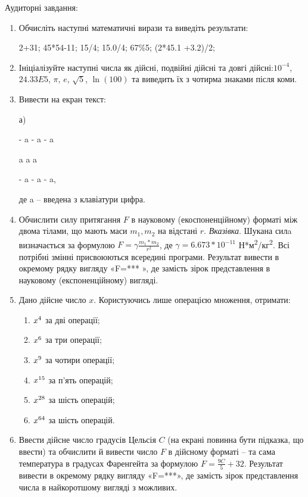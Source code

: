\documentclass[]{article}
\makeatletter
\newcommand{\xslalph}[1]{\expandafter\@xslalph\csname c@#1\endcsname}
\newcommand{\@xslalph}[1]{%
    \ifcase#1\or а\or б\or в\or г\or д\or e\or є\or ж\or з\or i%
    \or й\or к\or л\or м\or н\or о\or п\or р\or с\or т%
    \or у\or ф\or х\or ц\or ч\or ш\or ю\or я\or аа\or бб\or вв%
    \else\@ctrerr\fi%
}
\makeatother
\begin{document}
Аудиторні завдання:

\begin{enumerate}
\def\labelenumi{\arabic{enumi}.}
\item
  Обчисліть наступні математичні вирази та виведіть результати:

2+31; 45*54-11; 15/4; 15.0/4; 67\%5; (2*45.1 +3.2)/2;

\item
  Ініціалізуйте наступні числа як дійсні, подвійні дійсні та довгі
  дійсні:$10^{-4}$, $24.33E5$, $\pi$, $e$, $\sqrt{5}$,
  $\ln(100)$ та виведить їх з чотирма знаками після коми.

\item
  Вивести на екран текст:

а) 

-\/ a -\/ a -\/ a

a \textbar{} a \textbar{} a

-\/ a -\/ a -\/ a,

де a -- введена з клавіатури цифра.

\item
  Обчислити силу притягання $F$ в науковому (екоспоненційному) форматі між двома тілами,
  що мають маси $m_{1},m_{2}$ на відстані $r$. 
  \emph{\emph{Вказівка}}. Шукана силa визначається за формулою 
  $ F=\gamma \frac{m_{1}*m_{2}}{r^{2}}$,
  де $\gamma = 6.673*10^{-11}$ Н*м\textsuperscript{2}/кг\textsuperscript{2}. Всі потрібні змінні
  присвоюються всередині програми. Результат вивести в окремому рядку
  вигляду «F=*** », де замість зірок представлення в науковому
  (експоненційному) вигляді.

\item
  Дано дійсне число \(x\). Користуючись лише операцією множення,
  отримати:
  \begin{enumerate}[label=\xslalph*)]
  \item  \(x\textsuperscript{4}\) за дві операції; 
  \item  \(x\textsuperscript{6}\) за три операції;
  \item \(x\textsuperscript{9}\) за чотири операції; 
  \item \(x\textsuperscript{15}\) за п'ять операцій;
  \item \(x\textsuperscript{28}\) за шість операцій; 
  \item \(x\textsuperscript{64}\) за шість операцій.
  \end{enumerate}

\item
  Ввести дійсне число градусів Цельсія $C$ (на екрані повинна бути
  підказка, що ввести) та обчислити й вивести число $F$ в дійсному форматі
  -- та сама температура в градусах Фаренгейта за формулою $F = \frac{9C}{5} + 32 $.
 Результат вивести в окремому рядку вигляду «F=***», де замість зірок представлення числа в найкоротшому вигляді
  з можливих.


\end{enumerate}
\end{document}
